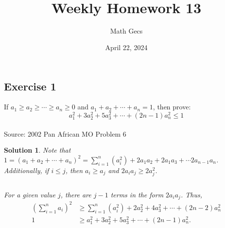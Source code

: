 \documentclass[12pt]{article}
\title{Weekly Homework 13}
\author{Math Gecs}
\date{April 22, 2024}
\newtheorem*{solution*}{Solution}
\begin{document}
\maketitle

\subsection*{Exercise 1}
If $a_1 \geq a_2 \geq \cdots \geq a_n \geq 0$ and $a_1+a_2+\cdots+a_n=1$, then prove:
$$a_1^2+3a_2^2+5a_3^2+ \cdots +(2n-1)a_n^2 \leq 1$$
\\

Source: 2002 Pan African MO Problem 6\\

\begin{solution*}
Note that $1 = (a_1 + a_2 + \cdots + a_n)^2 = \sum_{i=1}^{n} (a_i^2) + 2a_1a_2 + 2a_1a_3 + \cdots 2a_{n-1}a_n$.  Additionally, if $i \le j$, then $a_i \ge a_j$ and $2a_i a_j \ge 2a_j^2$.

$$$$

For a given value $j$, there are $j-1$ terms in the form $2a_ia_j$.  Thus,
$$\begin{align*}
(\sum_{i=1}^n a_i)^2 &\ge \sum_{i=1}^{n} (a_i^2) + 2a_2^2 + 4a_3^2 + \cdots + (2n-2)a_n^2 \\
1 &\ge a_1^2 + 3a_2^2 + 5a_3^2 + \cdots + (2n-1)a_n^2.
\end{align*}$$

\end{solution*}
\end{document}
